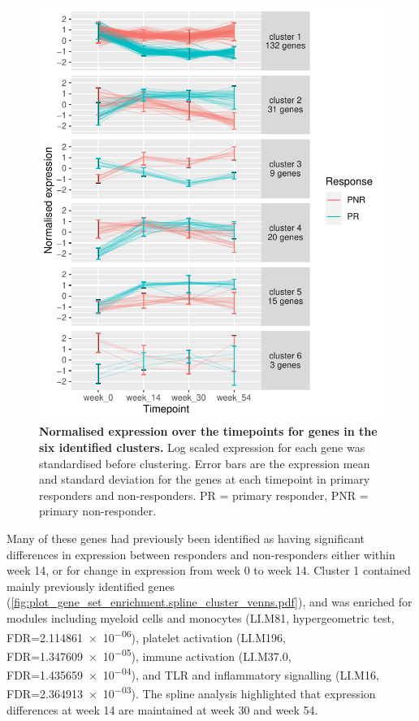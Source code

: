 \begin{figure}
    \centering
    \includegraphics[width=1.0\textwidth,page=1]{mainmatter/figures/chapter_04/plot_gene_set_enrichment.spline_cluster_trajectories.pdf}
    \caption{
        \textbf{Normalised expression over the timepoints for genes in the six identified clusters.}
        Log scaled expression for each gene was standardised before clustering.
        Error bars are the expression mean and standard deviation for the genes at each timepoint in primary responders and non-responders.
        PR = primary responder, PNR = primary non-responder.
    }
    \label{fig:multipants_dge_spline_cluster_trajectories}
\end{figure}

Many of these genes had previously been identified as having significant differences in expression between responders and non-responders
either within week 14, or for change in expression from week 0 to week 14.
Cluster 1 contained mainly previously identified genes (\cref{fig:plot_gene_set_enrichment.spline_cluster_venns.pdf}),
and was enriched for modules including 
myeloid cells and monocytes (LI.M81, hypergeometric test, FDR=\num{2.114861e-06}),
platelet activation (LI.M196, FDR=\num{1.347609e-05}),
immune activation (LI.M37.0, FDR=\num{1.435659e-04}),
and TLR and inflammatory signalling (LI.M16, FDR=\num{2.364913e-03}).
The spline analysis highlighted that expression differences at week 14 are maintained at week 30 and week 54.

